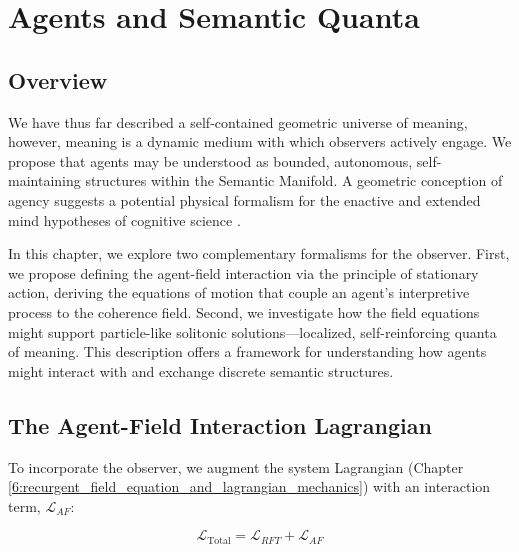 \chapter{Agents and Semantic Quanta}
\label{13:agents_and_semantic_quanta}


\section{Overview}
\label{13.1:overview}

We have thus far described a self-contained geometric universe of meaning, however, meaning is a dynamic medium with which observers actively engage. We propose that agents may be understood as bounded, autonomous, self-maintaining structures within the Semantic Manifold. A geometric conception of agency suggests a potential physical formalism for the enactive and extended mind hypotheses of cognitive science \autocite{VarelaThompsonRosch1991, ClarkChalmers1998}.

In this chapter, we explore two complementary formalisms for the observer. First, we propose defining the agent-field interaction via the principle of stationary action, deriving the equations of motion that couple an agent's interpretive process to the coherence field. Second, we investigate how the field equations might support particle-like solitonic solutions—localized, self-reinforcing quanta of meaning. This description offers a framework for understanding how agents might interact with and exchange discrete semantic structures.


\section{The Agent-Field Interaction Lagrangian}
\label{13.2:the_agent_field_interaction_lagrangian}

To incorporate the observer, we augment the system Lagrangian (Chapter \ref{6:recurgent_field_equation_and_lagrangian_mechanics}) with an interaction term, \(\mathcal{L}_{AF}\):

\begin{equation}
\mathcal{L}_{\text{Total}} = \mathcal{L}_{RFT} + \mathcal{L}_{AF}
\end{equation}

